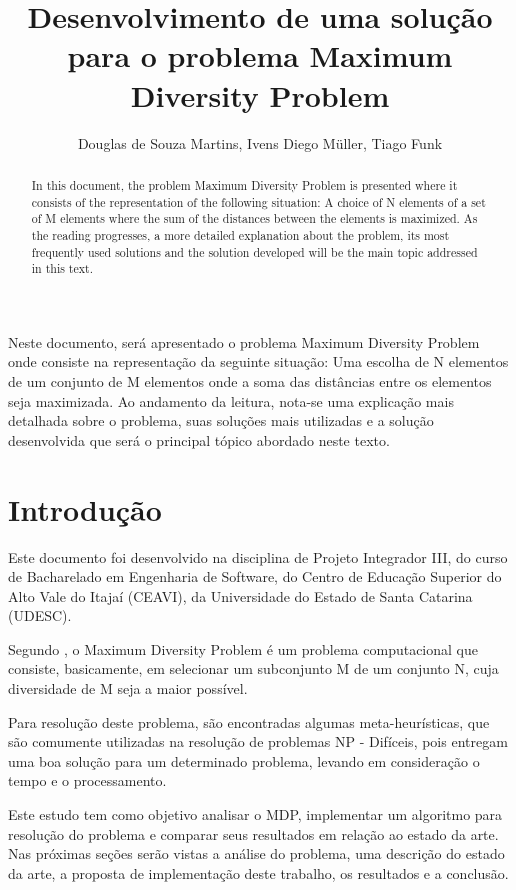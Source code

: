 \documentclass[12pt]{article}
\title{Desenvolvimento de uma solução para o problema Maximum Diversity Problem}
\author{Douglas de Souza Martins\inst{1}, Ivens Diego Müller\inst{1}, Tiago Funk\inst{1}}
\begin{document}
 

\maketitle

\begin{abstract}
  In this document, the problem Maximum Diversity Problem is presented where it consists of the representation of the following situation: A choice of N elements of a set of M elements where the sum of the distances between the elements is maximized. As the reading progresses, a more detailed explanation about the problem, its most frequently used solutions and the solution developed will be the main topic addressed in this text.
\end{abstract}
     
\begin{resumo} 
  Neste documento, será apresentado o problema Maximum Diversity Problem onde consiste na representação da seguinte situação: Uma escolha de N elementos de um conjunto de M elementos onde a soma das distâncias entre os elementos seja maximizada. Ao andamento da leitura, nota-se uma explicação mais detalhada sobre o problema, suas soluções mais utilizadas e a solução desenvolvida que será o principal tópico abordado neste texto.
\end{resumo}

\section{Introdução}
Este documento foi desenvolvido na disciplina de Projeto Integrador III, do curso de Bacharelado em Engenharia de Software, do Centro de Educação Superior do Alto Vale do Itajaí (CEAVI), da Universidade do Estado de Santa Catarina (UDESC).

Segundo \cite{silva2004experimental}, o Maximum Diversity Problem é um problema computacional que consiste, basicamente, em selecionar um subconjunto M de um conjunto N, cuja diversidade de M seja a maior possível.

Para resolução deste problema, são encontradas algumas meta-heurísticas, que são comumente utilizadas na resolução de problemas NP - Difíceis, pois entregam uma boa solução para um determinado problema, levando em consideração o tempo e o processamento.

Este estudo tem como objetivo analisar o MDP, implementar um algoritmo para resolução do problema e comparar seus resultados em relação ao estado da arte. Nas próximas seções serão vistas a análise do problema, uma descrição do estado da arte, a proposta de implementação deste trabalho, os resultados e a conclusão.
\end{document}

